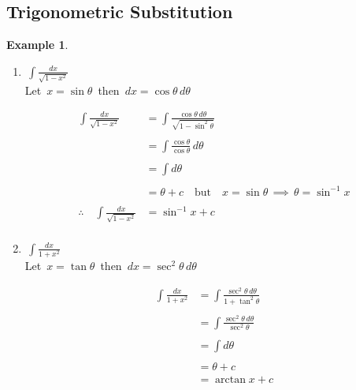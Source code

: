 \documentclass[11pt,a4paper]{article}
\theoremstyle{definition}
\newtheorem{example}[thm]{Example}
\begin{document}
\subsection{Trigonometric Substitution}

\begin{example}


\begin{enumerate}
\item $\,\displaystyle{\int \frac{dx}{\sqrt{1 - x^2}}}$\\

Let $\, x = \sin \theta\,$ then $\, dx = \cos \theta \,d\theta$


\begin{align*}
\int \frac{dx}{\sqrt{1 - x^2}} & = \int \frac{\cos \theta\,d \theta}{\sqrt{1 - \sin^2\theta}}\\\\
& = \int \frac{\cos \theta}{\cos \theta}\,d\theta\\\\
& = \int d\theta\\\\
& = \theta + c \quad \text{but}\quad  x = \sin \theta \,\implies\, \theta = \sin^{-1}x\\\\
\therefore\quad  \int \frac{dx}{\sqrt{1 - x^2}} & = \sin^{-1} x + c\\
\end{align*}




\item $\,\displaystyle{\int \frac{dx}{1 + x^2}}$\\

Let $\, x = \tan \theta\,$ then $\, dx = \sec^2\theta \,d\theta$

\begin{align*}
\int \frac{dx}{1 + x^2} & = \int \frac{\sec^2\theta \,d\theta}{1 + \tan^2\theta}\\\\
& = \int \frac{\sec^2\theta \,d\theta}{\sec^2\theta}\\\\
& = \int d\theta\\\\
& = \theta + c\\
& = \arctan x + c\\\\
\end{align*}
\end{enumerate}
\end{example}
\end{document}
